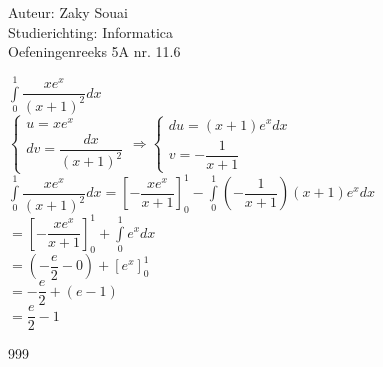 \documentclass[a4paper]{article}
\begin{document}
  
\noindent \large Auteur: Zaky Souai \\
\noindent \large Studierichting:  Informatica\\
\noindent \large Oefeningenreeks 5A nr. 11.6\\

\bigskip

\normalsize

$ \displaystyle\int\limits_0^1 \dfrac{xe^x}{(x+1)^2}dx $\\

$ \left\{
\begin{array}{l}
u=xe^x\\
dv=\dfrac{dx}{(x+1)^2}
\end{array}
\right.
\Rightarrow
\left\{
\begin{array}{l}
du=(x+1)e^xdx\\
v=-\dfrac{1}{x+1}
\end{array}
\right. $\\

$ \displaystyle\int\limits_0^1 \dfrac{xe^x}{(x+1)^2}dx = \left[-\dfrac{xe^x}{x+1}\right]_0^1 - \displaystyle\int\limits_0^1 \left(-\dfrac{1}{x+1}\right)(x+1)e^xdx $\\

$ =\left[-\dfrac{xe^x}{x+1}\right]_0^1+\displaystyle\int\limits_0^1 e^xdx $\\

$ =\left(-\dfrac{e}{2}-0\right)+\left[e^x\right]_0^1 $\\

$ =-\dfrac{e}{2}+(e-1) $\\

$ =\dfrac{e}{2}-1 $\\

\begin{thebibliography}{999}
\end{thebibliography}
\end{document}
